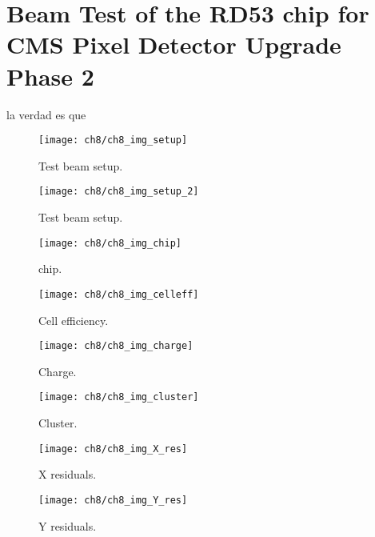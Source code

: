 \chapter{Beam Test of the RD53 chip for CMS Pixel Detector Upgrade Phase 2}\label{ch:testbeam}


la verdad es que
\begin{figure}[!h]
	\centering
	\texttt{[image: ch8/ch8\_img\_setup]}
	\caption[Test beam setup] {Test beam setup.}
	\label{ch8imgsetup}
\end{figure}


\begin{figure}[!h]
	\centering
	\texttt{[image: ch8/ch8\_img\_setup\_2]}
	\caption[Test beam setup] {Test beam setup.}
	\label{ch8imgsetup2}
\end{figure}

\begin{figure}[!h]
	\centering
	\texttt{[image: ch8/ch8\_img\_chip]}
	\caption[chip] {chip.}
	\label{chip}
\end{figure}


\begin{figure}[!h]
	\centering
	\texttt{[image: ch8/ch8\_img\_celleff]}
	\caption[Cell efficiency] {Cell efficiency.}
	\label{celleff}
\end{figure}

\begin{figure}[!h]
	\centering
	\texttt{[image: ch8/ch8\_img\_charge]}
	\caption[Charge] {Charge.}
	\label{charge}
\end{figure}

\begin{figure}[!h]
	\centering
	\texttt{[image: ch8/ch8\_img\_cluster]}
	\caption[Cluster.] {Cluster.}
	\label{cluster}
\end{figure}

\begin{figure}[!h]
	\centering
	\texttt{[image: ch8/ch8\_img\_X\_res]}
	\caption[X_residuals.] {X residuals.}
	\label{xres}
\end{figure}

\begin{figure}[!h]
	\centering
	\texttt{[image: ch8/ch8\_img\_Y\_res]}
	\caption[Y residuals.] {Y residuals.}
	\label{yres}
\end{figure}




